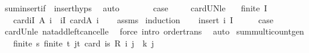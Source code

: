 \begin{isabellebody}
\ sum{\isachardot}{\kern0pt}insert{\isacharunderscore}{\kern0pt}if\ \ insert{\isachardot}{\kern0pt}hyps\ \isamarkupfalse%
\ auto\isanewline
\ \ \ \ \isamarkupfalse%
\ \isamarkupfalse%
\ {\isacharquery}{\kern0pt}case\ \isacommand{{\isachardot}{\kern0pt}}\isamarkupfalse%
\isanewline
\ \ \isamarkupfalse%
\isanewline
{}\isamarkupfalse%
%
\endisatagproof
{\isafoldproof}%
%
\isadelimproof
\isanewline
%
\endisadelimproof
\isanewline
{}\isamarkupfalse%
\ card{\isacharunderscore}{\kern0pt}UN{\isacharunderscore}{\kern0pt}le{\isacharcolon}{\kern0pt}\isanewline
\ \ \ {\isachardoublequoteopen}finite\ I{\isachardoublequoteclose}\isanewline
\ \ \ {\isachardoublequoteopen}card{\isacharparenleft}{\kern0pt}{\isasymUnion}i{\isasymin}I{\isachardot}{\kern0pt}\ A\ i{\isacharparenright}{\kern0pt}\ {\isasymle}\ {\isacharparenleft}{\kern0pt}{\isasymSum}i{\isasymin}I{\isachardot}{\kern0pt}\ card{\isacharparenleft}{\kern0pt}A\ i{\isacharparenright}{\kern0pt}{\isacharparenright}{\kern0pt}{\isachardoublequoteclose}\isanewline
%
\isadelimproof
\ \ %
\endisadelimproof
%
\isatagproof
{}\isamarkupfalse%
\ assms\isanewline
{}\isamarkupfalse%
\ induction\isanewline
\ \ \isamarkupfalse%
\ {\isacharparenleft}{\kern0pt}insert\ i\ I{\isacharparenright}{\kern0pt}\isanewline
\ \ \isamarkupfalse%
\ \isamarkupfalse%
\ {\isacharquery}{\kern0pt}case\isanewline
\ \ \ \ \isamarkupfalse%
\ card{\isacharunderscore}{\kern0pt}Un{\isacharunderscore}{\kern0pt}le\ nat{\isacharunderscore}{\kern0pt}add{\isacharunderscore}{\kern0pt}left{\isacharunderscore}{\kern0pt}cancel{\isacharunderscore}{\kern0pt}le\ \isamarkupfalse%
\ {\isacharparenleft}{\kern0pt}force\ intro{\isacharcolon}{\kern0pt}\ order{\isacharunderscore}{\kern0pt}trans{\isacharparenright}{\kern0pt}\ \isanewline
{}\isamarkupfalse%
\ auto%
\endisatagproof
{\isafoldproof}%
%
\isadelimproof
\isanewline
%
\endisadelimproof
\isanewline
{}\isamarkupfalse%
\ sum{\isacharunderscore}{\kern0pt}multicount{\isacharunderscore}{\kern0pt}gen{\isacharcolon}{\kern0pt}\isanewline
\ \ \ {\isachardoublequoteopen}finite\ s{\isachardoublequoteclose}\ {\isachardoublequoteopen}finite\ t{\isachardoublequoteclose}\ {\isachardoublequoteopen}{\isasymforall}j{\isasymin}t{\isachardot}{\kern0pt}\ {\isacharparenleft}{\kern0pt}card\ {\isacharbraceleft}{\kern0pt}i{\isasymin}s{\isachardot}{\kern0pt}\ R\ i\ j{\isacharbraceright}{\kern0pt}\ {\isacharequal}{\kern0pt}\ k\ j{\isacharparenright}{\kern0pt}{\isachardoublequoteclose}\isanewline

\end{isabellebody}
